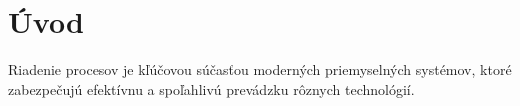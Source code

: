 \section*{Úvod}

Riadenie procesov je kľúčovou súčasťou moderných priemyselných systémov,
ktoré zabezpečujú efektívnu a spoľahlivú prevádzku rôznych technológií.

\pagebreak